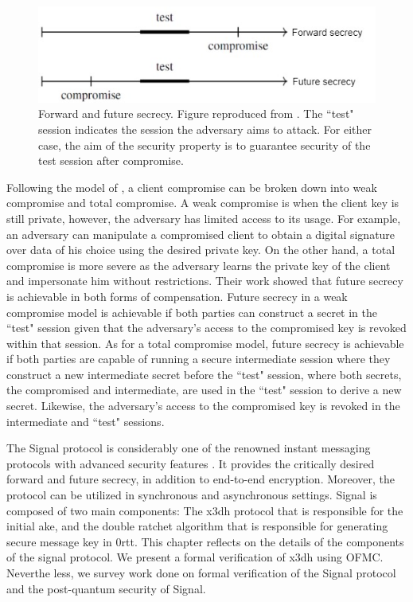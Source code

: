 \begin{figure}[htbp]
	\centering
	\includegraphics[scale=0.4]{Images/ffsecrecy.jpg}
	\caption[Forward and future secrecy]{Forward and future secrecy. Figure reproduced from \cite{cohn2016post}. The ``test" session indicates the session the adversary aims to attack. For either case, the aim of the security property is to guarantee security of the test session after compromise.}
	\label{forward-future_secrecy}
\end{figure}
Following the model of \cite{cohn2016post}, a client compromise can be broken down into weak compromise and total compromise. A weak compromise is when the client key is still private, however, the adversary has limited access to its usage. For example, an adversary can manipulate a compromised client to obtain a digital signature over data of his choice using the desired private key. On the other hand, a total compromise is more severe as the adversary learns the private key of the client and impersonate him without restrictions. Their work showed that future secrecy is achievable in both forms of compensation. Future secrecy in a weak compromise model is achievable if both parties can construct a secret in the ``test" session given that the adversary's access to the compromised key is revoked within that session. As for a total compromise model, future secrecy is achievable if both parties are capable of running a secure intermediate session where they construct a new intermediate secret before the ``test" session, where both secrets, the compromised and intermediate, are used in the ``test" session to derive a new secret. Likewise, the adversary's access to the compromised key is revoked in the intermediate and ``test" sessions.
\par
The Signal protocol is considerably one of the renowned instant messaging protocols with advanced security features \cite{unger2015sok}. It provides the critically desired forward and future secrecy, in addition to end-to-end encryption. Moreover, the protocol can be utilized in synchronous and asynchronous settings. Signal is composed of two main components: The \gls{x3dh} protocol \cite{x3dh} that is responsible for the initial \gls{ake}, and the double ratchet algorithm \cite{dblRtcht} that is responsible for generating secure message key in \gls{0rtt}. This chapter reflects on the details of the components of the signal protocol. We present a formal verification of \gls{x3dh} using OFMC. Neverthe less, we survey work done on formal verification of the Signal protocol and the post-quantum security of Signal.